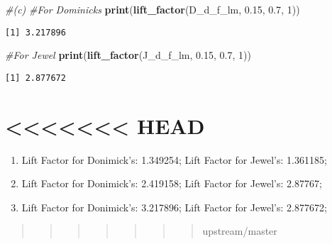\documentclass[]{article}
\newenvironment{Shaded}{\begin{snugshade}}{\end{snugshade}}
\newcommand{\CommentTok}[1]{\textcolor[rgb]{0.56,0.35,0.01}{\textit{#1}}}
\newcommand{\DecValTok}[1]{\textcolor[rgb]{0.00,0.00,0.81}{#1}}
\newcommand{\FloatTok}[1]{\textcolor[rgb]{0.00,0.00,0.81}{#1}}
\newcommand{\KeywordTok}[1]{\textcolor[rgb]{0.13,0.29,0.53}{\textbf{#1}}}
\newcommand{\NormalTok}[1]{#1}
\providecommand{\tightlist}{%
  \setlength{\itemsep}{0pt}\setlength{\parskip}{0pt}}
\begin{document}
\begin{Shaded}
\begin{Highlighting}[]
\CommentTok{#(c)}
\CommentTok{#For Dominicks}
\KeywordTok{print}\NormalTok{(}\KeywordTok{lift_factor}\NormalTok{(D_d_f_lm, }\FloatTok{0.15}\NormalTok{, }\FloatTok{0.7}\NormalTok{, }\DecValTok{1}\NormalTok{))}
\end{Highlighting}
\end{Shaded}

\begin{verbatim}
[1] 3.217896
\end{verbatim}

\begin{Shaded}
\begin{Highlighting}[]
\CommentTok{#For Jewel}
\KeywordTok{print}\NormalTok{(}\KeywordTok{lift_factor}\NormalTok{(J_d_f_lm, }\FloatTok{0.15}\NormalTok{, }\FloatTok{0.7}\NormalTok{, }\DecValTok{1}\NormalTok{))}
\end{Highlighting}
\end{Shaded}

\begin{verbatim}
[1] 2.877672
\end{verbatim}

\hypertarget{head-2}{%
\section{\textless{}\textless{}\textless{}\textless{}\textless{}\textless{}\textless{}
HEAD}\label{head-2}}

\begin{enumerate}
\def\labelenumi{(\alph{enumi})}
\tightlist
\item
  Lift Factor for Donimick's: 1.349254; Lift Factor for Jewel's:
  1.361185;
\item
  Lift Factor for Donimick's: 2.419158; Lift Factor for Jewel's:
  2.87767;
\item
  Lift Factor for Donimick's: 3.217896; Lift Factor for Jewel's:
  2.877672;
\end{enumerate}

\begin{quote}
\begin{quote}
\begin{quote}
\begin{quote}
\begin{quote}
\begin{quote}
\begin{quote}
upstream/master \newpage
\end{quote}
\end{quote}
\end{quote}
\end{quote}
\end{quote}
\end{quote}
\end{quote}
\end{document}

